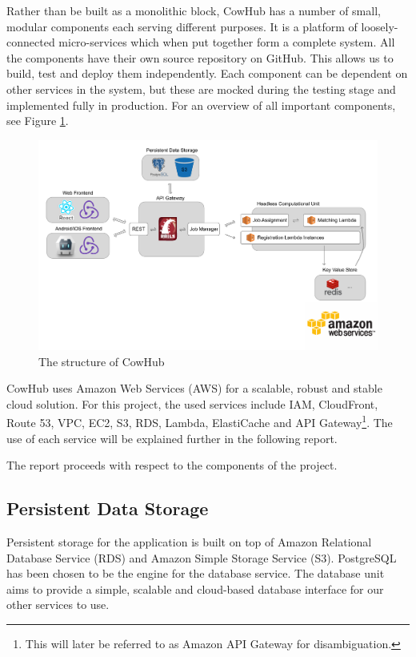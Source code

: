 Rather than be built as a monolithic block, CowHub has a number of small, modular components each serving different purposes. It is a platform of loosely-connected micro-services which when put together form a complete system. All the components have their own source repository on GitHub. This allows us to build, test and deploy them independently. Each component can be dependent on other services in the system, but these are mocked during the testing stage and implemented fully in production. For an overview of all important components, see Figure \ref{fig:structure}.

\begin{figure}
  \includegraphics[width=\textwidth]{sketch/structure.pdf}
  \caption{The structure of CowHub}
  \label{fig:structure}
\end{figure}

CowHub uses Amazon Web Services (AWS) for a scalable, robust and stable cloud solution. For this project, the used services include IAM, CloudFront, Route 53, VPC, EC2, S3, RDS, Lambda, ElastiCache and API Gateway\footnote{This will later be referred to as Amazon API Gateway for disambiguation.}. The use of each service will be explained further in the following report.

The report proceeds with respect to the components of the project.

\subsection{Persistent Data Storage}
Persistent storage for the application is built on top of Amazon Relational Database Service (RDS) and Amazon Simple Storage Service (S3). PostgreSQL has been chosen to be the engine for the database service. The database unit aims to provide a simple, scalable and cloud-based database interface for our other services to use.

